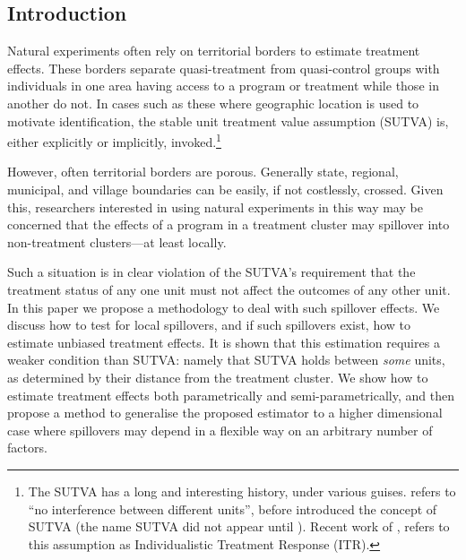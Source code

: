 \documentclass{article}
\begin{document}
\newpage
\begin{spacing}{1.1}
\section{Introduction}
Natural experiments often rely on territorial borders to estimate treatment 
effects.  These borders separate quasi-treatment from quasi-control groups with
individuals in one area having access to a program or treatment while those in 
another do not.  In cases such as these where geographic location is used to 
motivate identification, the stable unit treatment value assumption (SUTVA) is, 
either explicitly or implicitly, invoked.\footnote{The SUTVA has a long and 
interesting history, under various guises. \citet{Cox1958} refers to ``no 
interference between different units'', before \citet{Rubin1978} introduced the 
concept of SUTVA (the name SUTVA did not appear until \citet{Rubin1980}).  
Recent work of \citet{Manski2013}, refers to this assumption as Individualistic 
Treatment Response (ITR).}

However, often territorial borders are porous.  Generally state, regional,
municipal, and village boundaries can be easily, if not costlessly, crossed.
Given this, researchers interested in using natural experiments in this way may
be concerned that the effects of a program in a treatment cluster may spillover 
into non-treatment clusters---at least locally.

Such a situation is in clear violation of the SUTVA's requirement that the treatment
status of any one unit must not affect the outcomes of any other unit.  In this 
paper we propose a methodology to deal with such spillover effects.  We
discuss how to test for local spillovers, and if such spillovers exist, how to 
estimate unbiased treatment effects.  It is shown that this estimation requires
a weaker condition than SUTVA: namely that SUTVA holds between \emph{some} units, 
as determined by their distance from the treatment cluster.  We show how to 
estimate treatment effects both parametrically and semi-parametrically, and then
propose a method to generalise the proposed estimator to a higher dimensional 
case where spillovers may depend in a flexible way on an arbitrary number of 
factors.


\end{spacing}
\end{document}

